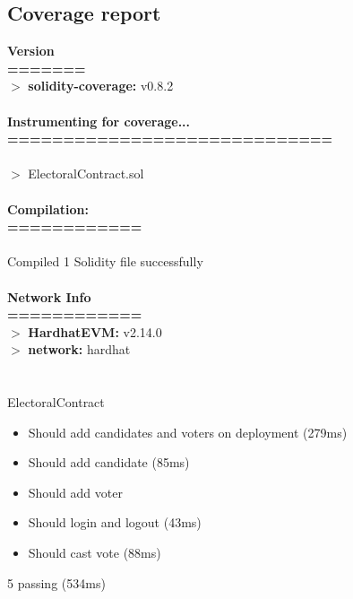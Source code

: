 \documentclass[oneside, 12pt]{book}
\begin{document}
	\subsection{Coverage report}
	\colorbox{gray!20}{%
		\begin{minipage}{\linewidth}%
			\vspace*{2pt}
			\textbf{Version}
			\\\textbf{=======}
			\\$>$ \textbf{solidity-coverage:} v0.8.2
			\\\\\textbf{Instrumenting for coverage...}
			\\\textbf{=============================}
			\\\\$>$ ElectoralContract.sol
			\\\\\textbf{Compilation:}
			\\\textbf{============}
			\\\\Compiled 1 Solidity file successfully
			\\\\\textbf{Network Info}
			\\\textbf{============}
			\\$>$ \textbf{HardhatEVM:} v2.14.0
			\\$>$ \textbf{network:}    hardhat
			\\\\\\ElectoralContract
			\begin{itemize}
				\item[\checkmark] Should add candidates and voters on deployment (279ms)
				\item[\checkmark] Should add candidate (85ms)
				\item[\checkmark] Should add voter
				\item[\checkmark] Should login and logout (43ms)
				\item[\checkmark] Should cast vote (88ms)
			\end{itemize}
			5 passing (534ms)
			\begin{table}[H]
\end{table}
\end{minipage}}
\end{document}
